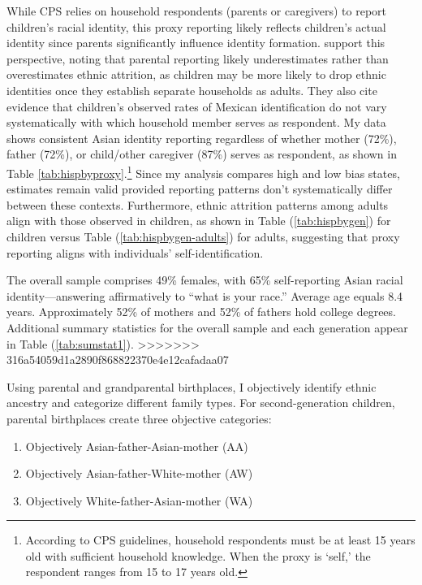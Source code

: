 While CPS relies on household respondents (parents or caregivers) to report children's racial identity, this proxy reporting likely reflects children's actual identity since parents significantly influence identity formation. \textcite{antmanEthnicAttritionAssimilation2020} support this perspective, noting that parental reporting likely underestimates rather than overestimates ethnic attrition, as children may be more likely to drop ethnic identities once they establish separate households as adults. They also cite evidence that children's observed rates of Mexican identification do not vary systematically with which household member serves as respondent. My data shows consistent Asian identity reporting regardless of whether mother (72\%), father (72\%), or child/other caregiver (87\%) serves as respondent, as shown in Table \ref{tab:hispbyproxy}.\footnote{According to CPS guidelines, household respondents must be at least 15 years old with sufficient household knowledge. When the proxy is `self,' the respondent ranges from 15 to 17 years old.} Since my analysis compares high and low bias states, estimates remain valid provided reporting patterns don't systematically differ between these contexts. Furthermore, ethnic attrition patterns among adults align with those observed in children, as shown in Table (\ref{tab:hispbygen}) for children versus Table (\ref{tab:hispbygen-adults}) for adults, suggesting that proxy reporting aligns with individuals' self-identification. 

The overall sample comprises 49\% females, with 65\% self-reporting Asian racial identity—answering affirmatively to ``what is your race.'' Average age equals 8.4 years. Approximately 52\% of mothers and 52\% of fathers hold college degrees. Additional summary statistics for the overall sample and each generation appear in Table (\ref{tab:sumstat1}).
>>>>>>> 316a54059d1a2890f868822370e4e12cafadaa07

Using parental and grandparental birthplaces, I objectively identify ethnic ancestry and categorize different family types. For second-generation children, parental birthplaces create three objective categories:
\begin{enumerate}
\item Objectively Asian-father-Asian-mother (AA)
\item Objectively Asian-father-White-mother (AW)  
\item Objectively White-father-Asian-mother (WA)
\end{enumerate}

